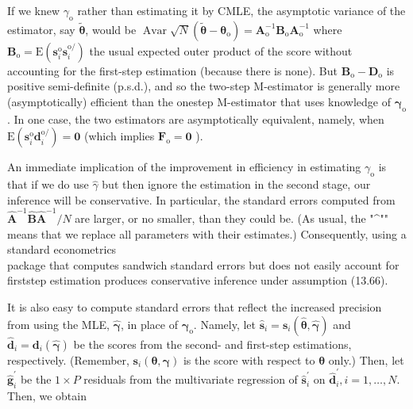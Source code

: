 \documentclass[10pt]{article}
\begin{document}
If we knew $\gamma_{\mathrm{o}}$ rather than estimating it by CMLE, the asymptotic variance of the estimator, say $\tilde{\boldsymbol{\theta}}$, would be $\operatorname{Avar} \sqrt{N}\left(\tilde{\boldsymbol{\theta}}-\boldsymbol{\theta}_{\mathrm{o}}\right)=\mathbf{A}_{\mathrm{o}}^{-1} \mathbf{B}_{\mathrm{o}} \mathbf{A}_{\mathrm{o}}^{-1}$ where $\mathbf{B}_{\mathrm{o}}=\mathrm{E}\left(\mathbf{s}_{i}^{\mathrm{o}} \mathbf{s}_{i}^{\mathrm{o} /}\right)$ the usual expected outer product of the score without accounting for the first-step estimation (because there is none). But $\mathbf{B}_{\mathrm{o}}-\mathbf{D}_{\mathrm{o}}$ is positive semi-definite (p.s.d.), and so the two-step M-estimator is generally more (asymptotically) efficient than the onestep M-estimator that uses knowledge of $\boldsymbol{\gamma}_{\mathrm{o}}$. In one case, the two estimators are asymptotically equivalent, namely, when $\mathrm{E}\left(\mathbf{s}_{i}^{\mathrm{o}} \mathbf{d}_{i}^{\mathrm{o} /}\right)=\mathbf{0}$ (which implies $\mathbf{F}_{\mathrm{o}}=\mathbf{0}$ ).

An immediate implication of the improvement in efficiency in estimating $\gamma_{\mathrm{o}}$ is that if we do use $\hat{\gamma}$ but then ignore the estimation in the second stage, our inference will be conservative. In particular, the standard errors computed from $\hat{\mathbf{A}}^{-1} \hat{\mathbf{B}} \hat{\mathbf{A}}^{-1} / N$ are larger, or no smaller, than they could be. (As usual, the "\^{}"" means that we replace all parameters with their estimates.) Consequently, using a standard econometrics\\
package that computes sandwich standard errors but does not easily account for firststep estimation produces conservative inference under assumption (13.66).

It is also easy to compute standard errors that reflect the increased precision from using the MLE, $\hat{\boldsymbol{\gamma}}$, in place of $\boldsymbol{\gamma}_{\mathrm{o}}$. Namely, let $\hat{\mathbf{s}}_{i}=\mathbf{s}_{i}(\hat{\boldsymbol{\theta}}, \hat{\boldsymbol{\gamma}})$ and $\hat{\mathbf{d}}_{i}=\mathbf{d}_{i}(\hat{\boldsymbol{\gamma}})$ be the scores from the second- and first-step estimations, respectively. (Remember, $\mathbf{s}_{i}(\boldsymbol{\theta}, \boldsymbol{\gamma})$ is the score with respect to $\boldsymbol{\theta}$ only.) Then, let $\hat{\mathbf{g}}_{i}^{\prime}$ be the $1 \times P$ residuals from the multivariate regression of $\hat{\mathbf{s}}_{i}^{\prime}$ on $\hat{\mathbf{d}}_{i}^{\prime}, i=1, \ldots, N$. Then, we obtain
\end{document}
